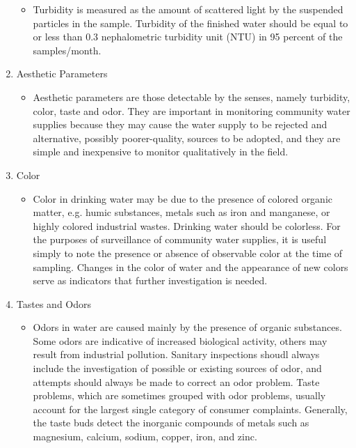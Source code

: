 \begin{enumerate}
\begin{itemize}
\item Turbidity is measured as the amount of scattered light by the suspended particles in the sample. Turbidity of the finished water should be equal to or less than 0.3 nephalometric turbidity unit (NTU) in 95 percent of the samples/month.
\end{itemize}






\item Aesthetic Parameters
 \begin{itemize}
\item Aesthetic parameters are those detectable by the senses, namely turbidity, color, taste and odor. They are important in monitoring community water supplies because they may cause the water supply to be rejected and alternative, possibly poorer-quality, sources to be adopted, and they are simple and inexpensive to monitor qualitatively in the field.
\end{itemize}

\item Color
\begin{itemize}
\item Color in drinking water may be due to the presence of colored organic matter, e.g. humic substances, metals such as iron and manganese, or highly colored industrial wastes. Drinking water should be colorless. For the purposes of surveillance of community water supplies, it is useful simply to note the presence or absence of observable color at the time of sampling. Changes in the color of water and the appearance of new colors serve as indicators that further investigation is needed.
\end{itemize}



\item Tastes and Odors
\begin{itemize}
\item Odors in water are caused mainly by the presence of organic substances. Some odors are indicative of increased biological activity, others may result from industrial pollution. Sanitary inspections shoudl always include the investigation of possible or existing sources of odor, and attempts should always be made to correct an odor problem. Taste problems, which are sometimes grouped with odor problems, usually account for the largest single category of consumer complaints. Generally, the taste buds detect the inorganic compounds of metals such as magnesium, calcium, sodium, copper, iron, and zinc.


\end{itemize}
\end{enumerate}
